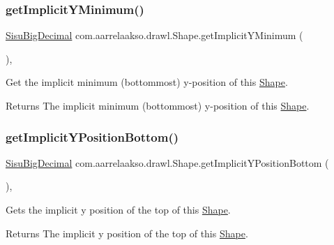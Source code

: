 \subsubsection{\texorpdfstring{get\+Implicit\+Y\+Minimum()}{getImplicitYMinimum()}}
{\footnotesize\ttfamily \hyperlink{classcom_1_1aarrelaakso_1_1drawl_1_1_sisu_big_decimal}{Sisu\+Big\+Decimal} com.\+aarrelaakso.\+drawl.\+Shape.\+get\+Implicit\+Y\+Minimum (\begin{DoxyParamCaption}{ }\end{DoxyParamCaption})\hspace{0.3cm}{\ttfamily [protected]}, {\ttfamily [inherited]}}



Get the implicit minimum (bottommost) y-\/position of this \hyperlink{classcom_1_1aarrelaakso_1_1drawl_1_1_shape}{Shape}. 

\begin{DoxyReturn}{Returns}
The implicit minimum (bottommost) y-\/position of this \hyperlink{classcom_1_1aarrelaakso_1_1drawl_1_1_shape}{Shape}. 
\end{DoxyReturn}
\mbox{\label{classcom_1_1aarrelaakso_1_1drawl_1_1_shape_a5116673c093c60f66bba9fddf9533db6}} 
\subsubsection{\texorpdfstring{get\+Implicit\+Y\+Position\+Bottom()}{getImplicitYPositionBottom()}}
{\footnotesize\ttfamily \hyperlink{classcom_1_1aarrelaakso_1_1drawl_1_1_sisu_big_decimal}{Sisu\+Big\+Decimal} com.\+aarrelaakso.\+drawl.\+Shape.\+get\+Implicit\+Y\+Position\+Bottom (\begin{DoxyParamCaption}{ }\end{DoxyParamCaption})\hspace{0.3cm}{\ttfamily [protected]}, {\ttfamily [inherited]}}



Gets the implicit y position of the top of this \hyperlink{classcom_1_1aarrelaakso_1_1drawl_1_1_shape}{Shape}. 

\begin{DoxyReturn}{Returns}
The implicit y position of the top of this \hyperlink{classcom_1_1aarrelaakso_1_1drawl_1_1_shape}{Shape}. 
\end{DoxyReturn}
\mbox{\label{classcom_1_1aarrelaakso_1_1drawl_1_1_shape_ad10def6c8dd7cbe03c281817406ab461}} 
